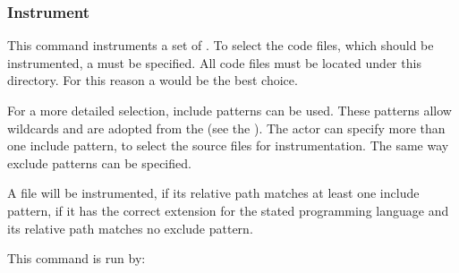 \subsubsection{Instrument} \label{fr:Batch:Instrument}
This command instruments a set of . To select the code files, which should be instrumented, a  must be specified. All code files must be located under this directory. For this reason a  would be the best choice.
\par
For a more detailed selection, include patterns can be used. These patterns allow wildcards and are adopted from the   (see the  ). The actor can specify more than one include pattern, to select the source files for instrumentation. The same way exclude patterns can be specified.
\par
A file will be instrumented, if its relative path matches at least one include pattern, if it has the correct extension for the stated programming language and its relative path matches no exclude pattern.
\par
This command is run by:
\begin{quote}
\end{quote}

